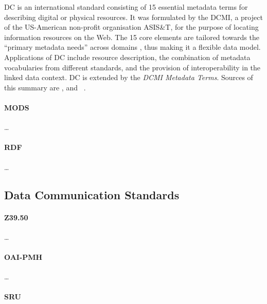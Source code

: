 \gls{DC} is an international standard consisting of 15 essential metadata terms
for describing digital or physical resources.
It was formulated by the \gls{DCMI}, a project of the US-American non-profit organisation
ASIS\&T, for the purpose of locating information resources on the Web.
The 15 core elements are tailored towards the \enquote{primary metadata needs} across domains
\autocite[p.215]{Hider2008}, thus making it a flexible data model.
Applications of \gls{DC} include resource description,
the combination of metadata vocabularies from different standards,
and the provision of interoperability in the linked data context.
\gls{DC} is extended by the \emph{DCMI Metadata Terms}.
Sources of this summary are \textcite[§§1, 10]{Hider2008},
and \citeauthor{WikiDC}~\autocite{WikiDC}.


\paragraph{MODS}

\dots

\paragraph{RDF}

\dots


\subsection{Data Communication Standards}

\paragraph{Z39.50}

\dots

\paragraph{OAI-PMH}

\dots

\paragraph{SRU}

